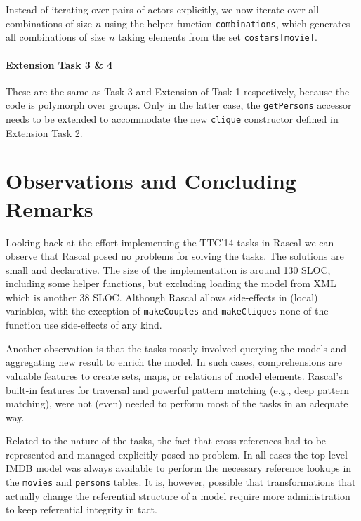 \documentclass[submission,copyright,creativecommons]{eptcs}
\begin{document}
Instead of iterating over pairs of actors explicitly, we now iterate over all combinations of size $n$ using the helper function \texttt{combinations}, which generates all combinations of size $n$ taking elements from the set \texttt{costars[movie]}. 

\paragraph{Extension Task 3 \& 4}

These are the same as Task 3 and Extension of Task 1 respectively,
because the code is polymorph over groups. Only in the latter case, the \texttt{getPersons} accessor needs to be extended to accommodate the new \texttt{clique} constructor defined in Extension Task 2. 

\section*{Observations and Concluding Remarks}


Looking back at the effort implementing the TTC'14 tasks in Rascal we can observe that Rascal posed no problems for solving the tasks. The solutions are small and declarative.  The size of the
implementation is around 130 SLOC, including some helper functions,
but excluding loading the model from XML which is another 38 SLOC. Although Rascal allows side-effects in (local) variables, with the exception of \texttt{makeCouples} and \texttt{makeCliques} none of the function use side-effects of any kind. 

Another observation is that the tasks mostly involved querying the models and aggregating new result to enrich the model. In such cases, comprehensions are valuable features to create sets, maps, or relations of model elements.  Rascal's built-in features for traversal and powerful pattern matching (e.g., deep pattern matching), were not (even) needed to perform most of the tasks in an adequate way.

Related to the nature of the tasks, the fact that cross references had to be represented and managed explicitly posed no problem. In all cases the top-level IMDB model was always available to perform the necessary reference lookups in the \texttt{movies} and \texttt{persons} tables. 
It is, however, possible that  transformations that actually change the referential structure of a model require more administration to keep referential integrity in tact.
\end{document}
